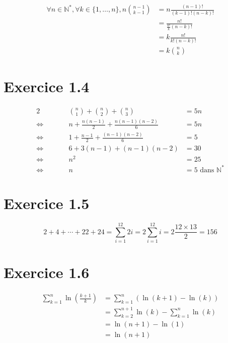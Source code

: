 \documentclass{report}
\begin{document}
\begin{equation*}
	\begin{split}
		\forall n \in \mathbb{N}^*, \forall k \in \{1,\ldots, n\}, n\binom{n-1}{k-1} &= n \frac{(n-1)!}{(k-1)!(n-k)!} \\
		                                                                          &= \frac{n!}{\frac{k!}{k}(n-k)!} \\
		                                                                          &= k \frac{n!}{k!(n-k)!} \\
		                                                                          &= k \binom{n}{k}
	\end{split}
\end{equation*}

\section*{Exercice 1.4}
\begin{alignat*}{2}
	                    &        &   \binom{n}{1} + \binom{n}{2} + \binom{n}{3} &= 5n \\
	\Longleftrightarrow & \qquad & n + \frac{n(n-1)}{2} + \frac{n(n-1)(n-2)}{6} &= 5n \\
	\Longleftrightarrow &        & 1 + \frac{n-1}{2} + \frac{(n-1)(n-2)}{6}     &= 5 \\
	\Longleftrightarrow &        &                      6 + 3(n-1) + (n-1)(n-2) &= 30 \\
    \Longleftrightarrow &        &                      n^2 &= 25 \\
    \Longleftrightarrow &        &                      n   &= 5 \text{ dans $\mathbb{N}^*$}
\end{alignat*}

\section*{Exercice 1.5}	


\[2 + 4 + \cdots + 22 + 24 = \sum_{i=1}^{12}2i 
		                   = 2\sum_{i=1}^{12}i 
		                   = 2\frac{12 \times 13}{2} 
		                   = 156 \]

\section*{Exercice 1.6}	
\begin{equation*}
	\begin{split}
		\sum_{k=1}^{n}\ln\left( \frac{k+1}{k}\right)  &= \sum_{k=1}^{n}\left( \ln(k+1)-\ln(k)\right) \\
		                                             &=  \sum_{k=2}^{n+1}\ln(k)- \sum_{k=1}^{n}\ln(k) \\
		                                             &= \ln(n+1) - \ln(1) \\
		                                             &= \ln(n+1)
	\end{split}
\end{equation*}
\end{document}
